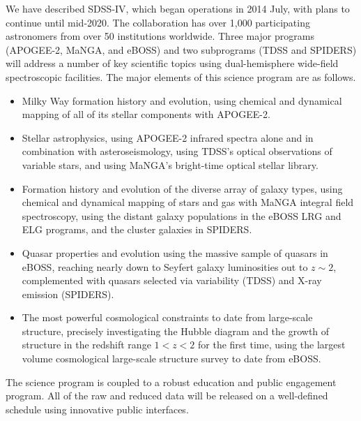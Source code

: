 We have described SDSS-IV, which began operations in 2014 July, with
plans to continue until mid-2020. The collaboration has over 1,000
participating astronomers from over 50 institutions worldwide. Three
major programs (APOGEE-2, MaNGA, and eBOSS) and two subprograms (TDSS
and SPIDERS) will address a number of key scientific topics using
dual-hemisphere wide-field spectroscopic facilities. The major
elements of this science program are as follows.
\begin{itemize}
\item Milky Way formation history and evolution, using chemical and
  dynamical mapping of all of its stellar components with APOGEE-2.
\item Stellar astrophysics, using APOGEE-2 infrared spectra alone and
  in combination with asteroseismology, using TDSS's optical
  observations of variable stars, and using MaNGA's bright-time
  optical stellar library.
\item Formation history and evolution of the diverse array of galaxy
  types, using chemical and dynamical mapping of stars and gas with
  MaNGA integral field spectroscopy, using the distant galaxy
  populations in the eBOSS LRG and ELG programs, and the cluster
  galaxies in SPIDERS.
\item Quasar properties and evolution using the massive sample of
  quasars in eBOSS, reaching nearly down to Seyfert galaxy
  luminosities out to $z\sim 2$, complemented with quasars selected
  via variability (TDSS) and X-ray emission (SPIDERS).
\item The most powerful cosmological constraints to date from
  large-scale structure, precisely investigating the Hubble diagram
  and the growth of structure in the redshift range $1<z<2$ for the
  first time, using the largest volume cosmological large-scale
  structure survey to date from eBOSS.
\end{itemize}

The science program is coupled to a robust education and public
engagement program. All of the raw and reduced data will be released
on a well-defined schedule using innovative public interfaces.
